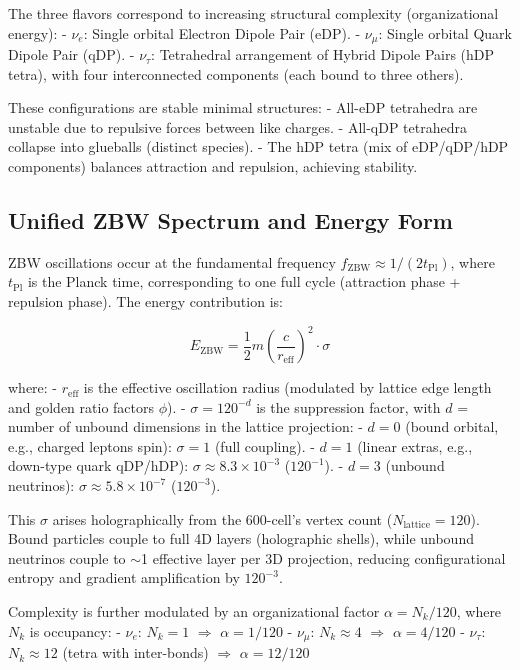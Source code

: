 \documentclass{article}
\begin{document}
The three flavors correspond to increasing structural complexity (organizational energy):
- $\nu_e$: Single orbital Electron Dipole Pair (eDP).
- $\nu_\mu$: Single orbital Quark Dipole Pair (qDP).
- $\nu_\tau$: Tetrahedral arrangement of Hybrid Dipole Pairs (hDP tetra), with four interconnected components (each bound to three others).

These configurations are stable minimal structures:
- All-eDP tetrahedra are unstable due to repulsive forces between like charges.
- All-qDP tetrahedra collapse into glueballs (distinct species).
- The hDP tetra (mix of eDP/qDP/hDP components) balances attraction and repulsion, achieving stability.

\subsection{Unified ZBW Spectrum and Energy Form}

ZBW oscillations occur at the fundamental frequency $f_{\text{ZBW}} \approx 1/(2 t_{\text{Pl}})$, where $t_{\text{Pl}}$ is the Planck time, corresponding to one full cycle (attraction phase + repulsion phase). The energy contribution is:

\[
E_{\text{ZBW}} = \frac{1}{2} m \left( \frac{c}{r_{\text{eff}}} \right)^2 \cdot \sigma
\]

where:
- $r_{\text{eff}}$ is the effective oscillation radius (modulated by lattice edge length and golden ratio factors $\phi$).
- $\sigma = 120^{-d}$ is the suppression factor, with $d$ = number of unbound dimensions in the lattice projection:
  - $d=0$ (bound orbital, e.g., charged leptons spin): $\sigma = 1$ (full coupling).
  - $d=1$ (linear extras, e.g., down-type quark qDP/hDP): $\sigma \approx 8.3 \times 10^{-3}$ ($120^{-1}$).
  - $d=3$ (unbound neutrinos): $\sigma \approx 5.8 \times 10^{-7}$ ($120^{-3}$).

This $\sigma$ arises holographically from the 600-cell's vertex count ($N_{\text{lattice}} = 120$). Bound particles couple to full 4D layers (holographic shells), while unbound neutrinos couple to $\sim$1 effective layer per 3D projection, reducing configurational entropy and gradient amplification by $120^{-3}$.

Complexity is further modulated by an organizational factor $\alpha = N_k / 120$, where $N_k$ is occupancy:
- $\nu_e$: $N_k = 1$ $\Rightarrow$ $\alpha = 1/120$
- $\nu_\mu$: $N_k \approx 4$ $\Rightarrow$ $\alpha = 4/120$
- $\nu_\tau$: $N_k \approx 12$ (tetra with inter-bonds) $\Rightarrow$ $\alpha = 12/120$
\end{document}
